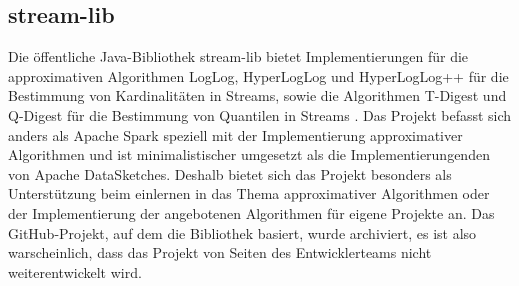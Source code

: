 \subsection{stream-lib}
Die öffentliche Java-Bibliothek stream-lib bietet Implementierungen für die approximativen Algorithmen LogLog, 
HyperLogLog und HyperLogLog++ für die Bestimmung von Kardinalitäten in Streams, 
sowie die Algorithmen T-Digest und Q-Digest für die Bestimmung von Quantilen in Streams \cite{streamlib2019}. 
Das Projekt befasst sich anders als Apache Spark speziell mit der Implementierung approximativer Algorithmen und ist minimalistischer umgesetzt als die Implementierungenden von Apache DataSketches. Deshalb bietet sich das Projekt besonders als Unterstützung beim einlernen in das Thema approximativer Algorithmen oder der Implementierung der angebotenen Algorithmen für eigene Projekte an.
Das GitHub-Projekt, auf dem die Bibliothek basiert, wurde archiviert, 
es ist also warscheinlich, dass das Projekt von Seiten des Entwicklerteams nicht weiterentwickelt wird.
